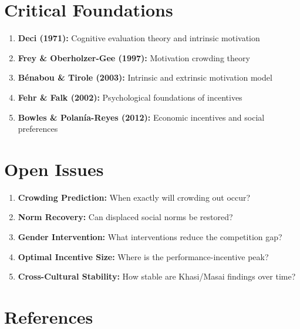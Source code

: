 \section{Critical Foundations}

\begin{enumerate}
    \item \textbf{Deci (1971):} Cognitive evaluation theory and intrinsic motivation
    \item \textbf{Frey \& Oberholzer-Gee (1997):} Motivation crowding theory
    \item \textbf{Bénabou \& Tirole (2003):} Intrinsic and extrinsic motivation model
    \item \textbf{Fehr \& Falk (2002):} Psychological foundations of incentives
    \item \textbf{Bowles \& Polanía-Reyes (2012):} Economic incentives and social preferences
\end{enumerate}

\section{Open Issues}

\begin{enumerate}
    \item \textbf{Crowding Prediction:} When exactly will crowding out occur?
    \item \textbf{Norm Recovery:} Can displaced social norms be restored?
    \item \textbf{Gender Intervention:} What interventions reduce the competition gap?
    \item \textbf{Optimal Incentive Size:} Where is the performance-incentive peak?
    \item \textbf{Cross-Cultural Stability:} How stable are Khasi/Masai findings over time?
\end{enumerate}

\section{References}

